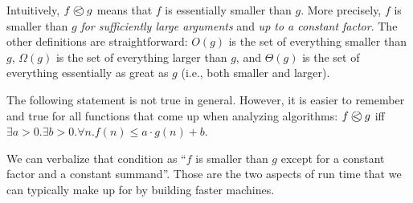 Intuitively, $\Oleq{f}{g}$ means that $f$ is essentially smaller than $g$.
More precisely, $f$ is smaller than $g$ \emph{for sufficiently large arguments} and \emph{up to a constant factor}.
The other definitions are straightforward: $O(g)$ is the set of everything smaller than $g$, $\Omega(g)$ is the set of everything larger than $g$, and
$\Theta(g)$ is the set of everything essentially as great as $g$ (i.e., both smaller and larger).

\begin{remark}
The following statement is not true in general.
However, it is easier to remember and true for all functions that come up when analyzing algorithms:
$\Oleq{f}{g}$ iff $\exists a>0.\exists b>0.\forall n. f(n)\leq a\cdot g(n)+b$.

We can verbalize that condition as ``$f$ is smaller than $g$ except for a constant factor and a constant summand''.
Those are the two aspects of run time that we can typically make up for by building faster machines.
\end{remark}


